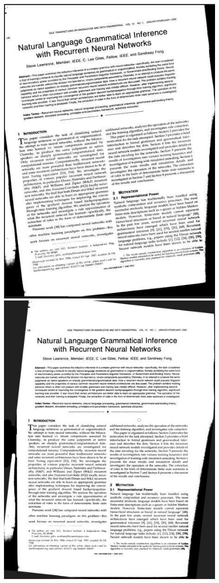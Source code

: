\begin{figure}
\centering
\includegraphics[height=0.25\textheight]{img/preprocessing/deskew_orig.jpg}
\qquad
\includegraphics[height=0.25\textheight]{img/preprocessing/deskew_new.jpg}

\end{figure}
